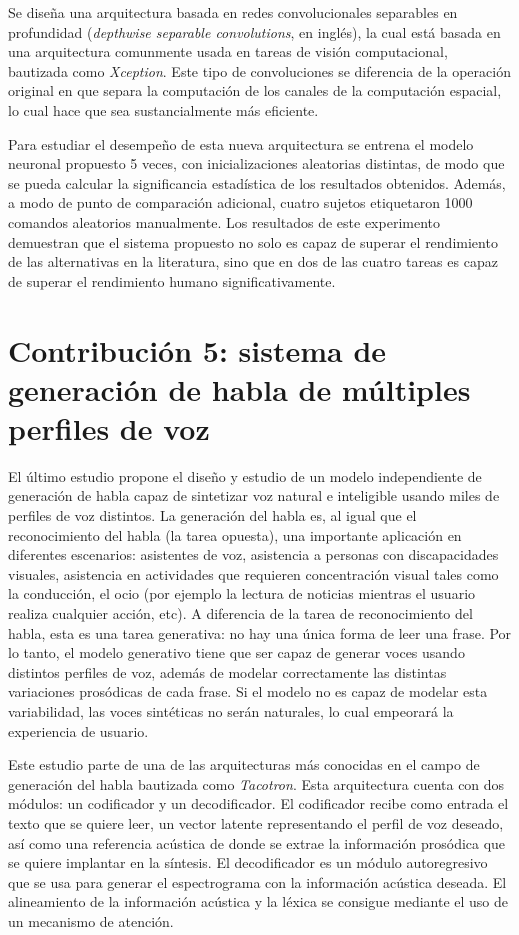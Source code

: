\documentclass[10pt,a4paper,titlepage,table]{report}
\begin{document}
Se diseña una arquitectura basada en redes convolucionales separables en profundidad (\textit{depthwise separable convolutions}, en inglés), la cual está basada en una arquitectura comunmente usada en tareas de visión computacional, bautizada como \textit{Xception}. Este tipo de convoluciones se diferencia de la operación original en que separa la computación de los canales de la computación espacial, lo cual hace que sea sustancialmente más eficiente. 

Para estudiar el desempeño de esta nueva arquitectura se entrena el modelo neuronal propuesto 5 veces, con inicializaciones aleatorias distintas, de modo que se pueda calcular la significancia estadística de los resultados obtenidos. Además, a modo de punto de comparación adicional, cuatro sujetos etiquetaron 1000 comandos aleatorios manualmente. Los resultados de este experimento demuestran que el sistema propuesto no solo es capaz de superar el rendimiento de las alternativas en la literatura, sino que en dos de las cuatro tareas es capaz de superar el rendimiento humano significativamente. 
	
\section*{Contribución 5: sistema de generación de habla de múltiples perfiles de voz}
El último estudio propone el diseño y estudio de un modelo independiente de generación de habla capaz de sintetizar voz natural e inteligible usando miles de perfiles de voz distintos. La generación del habla es, al igual que el reconocimiento del habla (la tarea opuesta), una importante aplicación en diferentes escenarios: asistentes de voz, asistencia a personas con discapacidades visuales, asistencia en actividades que requieren concentración visual tales como la conducción, el ocio (por ejemplo la lectura de noticias mientras el usuario realiza cualquier acción, etc). A diferencia de la tarea de reconocimiento del habla, esta es una tarea generativa: no hay una única forma de leer una frase. Por lo tanto, el modelo generativo tiene que ser capaz de generar voces usando distintos perfiles de voz, además de modelar correctamente las distintas variaciones prosódicas de cada frase. Si el modelo no es capaz de modelar esta variabilidad, las voces sintéticas no serán naturales, lo cual empeorará la experiencia de usuario.

Este estudio parte de una de las arquitecturas más conocidas en el campo de generación del habla bautizada como \textit{Tacotron}. Esta arquitectura cuenta con dos módulos: un codificador y un decodificador. El codificador recibe como entrada el texto que se quiere leer, un vector latente representando el perfil de voz deseado, así como una referencia acústica de donde se extrae la información prosódica que se quiere implantar en la síntesis. El decodificador es un módulo autoregresivo que se usa para generar el espectrograma con la información acústica deseada. El alineamiento de la información acústica y la léxica se consigue mediante el uso de un mecanismo de atención. 
\end{document}
